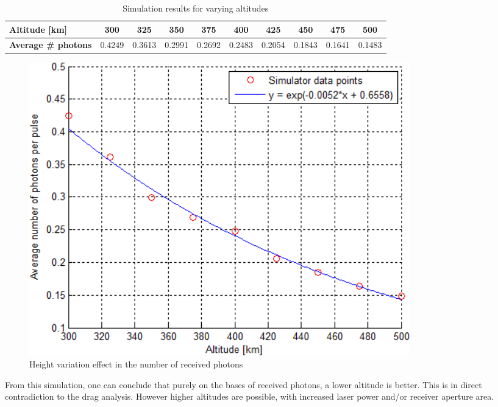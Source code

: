 \small
\begin{table}[ht!]
\begin{tabular}{ l | c | c | c | c | c | c | c |c | c }

		\textbf{Altitude [km]} &        300 &     325 &      350 &      375 &     400 &     425 &     450 &     475 &      500 \\
	\hline
		\textbf{Average \# photons }&  0.4249 &  0.3613 &   0.2991 &   0.2692 &  0.2483 &  0.2054 &  0.1843 &  0.1641 &   0.1483 \\

\end{tabular}
\caption{Simulation results for varying altitudes}
\label{table:simulationHeight}
\end{table} 

\begin{figure}[ht!]
	\centering
		\includegraphics[width=0.8\textwidth]{chapters/img/simulationHeight.png}
	
	\caption{Height variation effect in the number of received photons}
	\label{fig:simulationHeight}
\end{figure}

From this simulation, one can conclude that purely on the bases of received photons, a lower altitude is better. This is in direct contradiction to the drag analysis. However higher altitudes are possible, with increased \ac{laser} power and/or receiver aperture area.